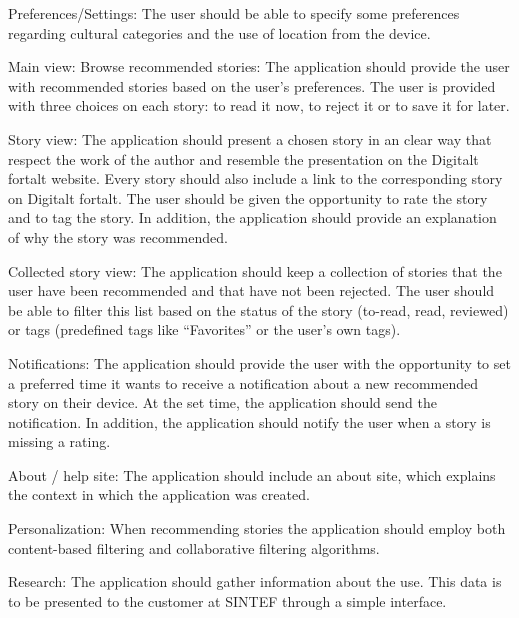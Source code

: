 Preferences/Settings: The user should be able to specify some preferences regarding cultural categories and the use of location from the device.\newline

Main view: Browse recommended stories: The application should provide the user with recommended stories based on the user’s preferences. The user is provided with three choices on each story: to read it now, to reject it or to save it for later.\newline

Story view: The application should present a chosen story in an clear way that respect the work of the author and resemble the presentation on the Digitalt fortalt website. Every story should also include a link to the corresponding story on Digitalt fortalt. The user should be given the opportunity to rate the story and to tag the story. In addition, the application should provide an explanation of why the story was recommended.\newline

Collected story view: The application should keep a collection of stories that the user have been recommended and that have not been rejected. The user should be able to filter this list based on the status of the story (to-read, read, reviewed) or tags (predefined tags like “Favorites” or the user’s own tags).\newline

Notifications: The application should provide the user with the opportunity to set a preferred time it wants to receive a notification about a new recommended story on their device. At the set time, the application should send the notification. In addition, the application should notify the user when a story is missing a rating.\newline

About / help site: The application should include an about site, which explains the context in which the application was created. \newline

Personalization: When recommending stories the application should employ both content-based filtering and collaborative filtering algorithms.\newline

Research: The application should gather information about the use. This data is to be presented to the customer at SINTEF through a simple interface.\newline

